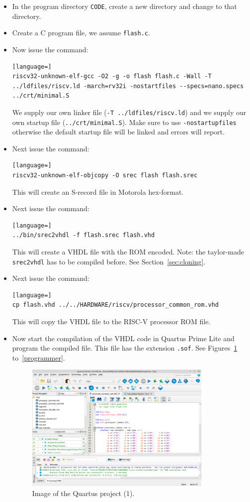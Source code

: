 \documentclass[12pt]{article}
\begin{document}
\begin{itemize}
\item In the program directory \lstinline|CODE|, create a new directory and change to that directory.
\item Create a C program file, we assume \lstinline|flash.c|.
\item Now issue the command:
\begin{lstlisting}[language=]
riscv32-unknown-elf-gcc -O2 -g -o flash flash.c -Wall -T ../ldfiles/riscv.ld -march=rv32i -nostartfiles --specs=nano.specs ../crt/minimal.S
\end{lstlisting}
We supply our own linker file (\lstinline|-T ../ldfiles/riscv.ld|) and we supply our own startup file (\lstinline|../crt/minimal.S|). Make sure to use \lstinline|-nostartupfiles| otherwise the default startup file will be linked and errors will report.
\item Next issue the command:
\begin{lstlisting}[language=]
riscv32-unknown-elf-objcopy -O srec flash flash.srec
\end{lstlisting}
This will create an S-record file in Motorola hex-format.
\item Next issue the command:
\begin{lstlisting}[language=]
../bin/srec2vhdl -f flash.srec flash.vhd
\end{lstlisting}
This will create a VHDL file with the ROM encoded. Note: the taylor-made \texttt{srec2vhdl} has to be compiled before. See Section~\ref{sec:cloning}.
\item Next issue the command:
\begin{lstlisting}[language=]
cp flash.vhd ../../HARDWARE/riscv/processor_common_rom.vhd
\end{lstlisting}
This will copy the VHDL file to the RISC-V processor ROM file.
\item Now start the compilation of the VHDL code in Quartus Prime Lite and program the compiled file. This file has the extension \lstinline|.sof|. See Figures~\ref{quartus1} to~\ref{programmer}.

\begin{figure}[!ht]
\centering
\includegraphics[width=0.85\textwidth]{quartus1}
\caption{Image of the Quartus project (1).}
\label{quartus1}
\end{figure}


\end{itemize}
\end{document}

